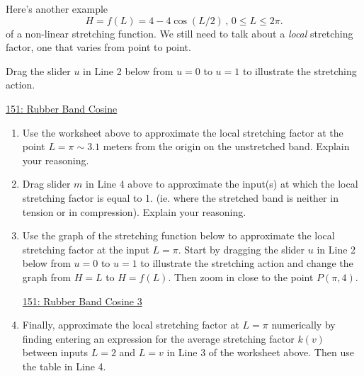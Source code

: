 \documentclass{ximera}
\begin{document}
\begin{example} \label{ExLdfdfthyhhhf}
Here's another example
\[
      H = f(L) = 4 - 4\cos (L/2) \, , \, 0\leq L \leq 2\pi.
\]
of a non-linear stretching function. We still need to talk about a \emph{local} stretching factor, one that varies from point to point. 

\begin{exploration} \label{ExLdfdfthyhhhf}
Drag the slider $u$ in Line 2 below from $u=0$ to $u=1$ to illustrate the stretching action.
\begin{onlineOnly}
    \begin{center}
\end{center}
\end{onlineOnly}

\href{https://www.desmos.com/calculator/hqvyhormhf}{151: Rubber Band Cosine}
\end{exploration}

\begin{enumerate}
\item Use the worksheet above to approximate the local stretching factor at the point $L = \pi \sim 3.1$ meters from the origin on the unstretched band. Explain your reasoning.

\item Drag slider $m$ in Line 4 above to approximate the input(s) at which the local stretching factor is equal to 1. (ie. where the stretched band is neither in tension or in compression). Explain your reasoning.



\item Use the graph of the stretching function below to approximate the local stretching factor at the input $L=\pi$.  Start by 
dragging the slider $u$ in Line 2 below from $u=0$ to $u=1$ to illustrate the stretching action and change the graph from $H=L$ to $H=f(L)$. Then zoom in close to the point $P(\pi,4)$.

\begin{onlineOnly}
    \begin{center}
\end{center}
\end{onlineOnly}

\href{https://www.desmos.com/calculator/aczfty35qj}{151: Rubber Band Cosine 3}

\item Finally, approximate the local stretching factor at $L=\pi$ numerically by finding entering an expression for the average stretching factor $k(v)$ between inputs $L=2$ and $L=v$ in Line 3 of the worksheet above. Then use the table in Line 4.

\end{enumerate}

\end{example}
\end{document}
